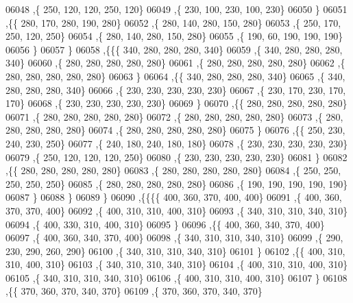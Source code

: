 \begin{DoxyCode}
06048     ,\{   250,   120,   120,   250,   120\}
06049     ,\{   230,   100,   230,   100,   230\}
06050     \}
06051    ,\{\{   280,   170,   280,   190,   280\}
06052     ,\{   280,   140,   280,   150,   280\}
06053     ,\{   250,   170,   250,   120,   250\}
06054     ,\{   280,   140,   280,   150,   280\}
06055     ,\{   190,    60,   190,   190,   190\}
06056     \}
06057    \}
06058   ,\{\{\{   340,   280,   280,   280,   340\}
06059     ,\{   340,   280,   280,   280,   340\}
06060     ,\{   280,   280,   280,   280,   280\}
06061     ,\{   280,   280,   280,   280,   280\}
06062     ,\{   280,   280,   280,   280,   280\}
06063     \}
06064    ,\{\{   340,   280,   280,   280,   340\}
06065     ,\{   340,   280,   280,   280,   340\}
06066     ,\{   230,   230,   230,   230,   230\}
06067     ,\{   230,   170,   230,   170,   170\}
06068     ,\{   230,   230,   230,   230,   230\}
06069     \}
06070    ,\{\{   280,   280,   280,   280,   280\}
06071     ,\{   280,   280,   280,   280,   280\}
06072     ,\{   280,   280,   280,   280,   280\}
06073     ,\{   280,   280,   280,   280,   280\}
06074     ,\{   280,   280,   280,   280,   280\}
06075     \}
06076    ,\{\{   250,   230,   240,   230,   250\}
06077     ,\{   240,   180,   240,   180,   180\}
06078     ,\{   230,   230,   230,   230,   230\}
06079     ,\{   250,   120,   120,   120,   250\}
06080     ,\{   230,   230,   230,   230,   230\}
06081     \}
06082    ,\{\{   280,   280,   280,   280,   280\}
06083     ,\{   280,   280,   280,   280,   280\}
06084     ,\{   250,   250,   250,   250,   250\}
06085     ,\{   280,   280,   280,   280,   280\}
06086     ,\{   190,   190,   190,   190,   190\}
06087     \}
06088    \}
06089   \}
06090  ,\{\{\{\{   400,   360,   370,   400,   400\}
06091     ,\{   400,   360,   370,   370,   400\}
06092     ,\{   400,   310,   310,   400,   310\}
06093     ,\{   340,   310,   310,   340,   310\}
06094     ,\{   400,   330,   310,   400,   310\}
06095     \}
06096    ,\{\{   400,   360,   340,   370,   400\}
06097     ,\{   400,   360,   340,   370,   400\}
06098     ,\{   340,   310,   310,   340,   310\}
06099     ,\{   290,   230,   290,   260,   290\}
06100     ,\{   340,   310,   310,   340,   310\}
06101     \}
06102    ,\{\{   400,   310,   310,   400,   310\}
06103     ,\{   340,   310,   310,   340,   310\}
06104     ,\{   400,   310,   310,   400,   310\}
06105     ,\{   340,   310,   310,   340,   310\}
06106     ,\{   400,   310,   310,   400,   310\}
06107     \}
06108    ,\{\{   370,   360,   370,   340,   370\}
06109     ,\{   370,   360,   370,   340,   370\}

\end{DoxyCode}

